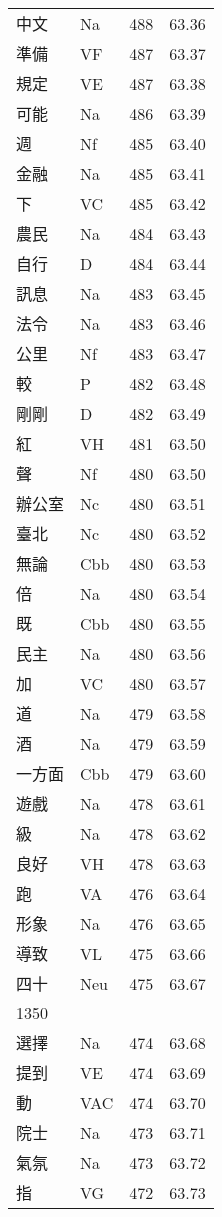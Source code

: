 \documentclass[twocolumn]{book}
\begin{document}
\begin{supertabular}{llrr}
中文 & Na & 488 &  63.36\\
準備 & VF & 487 &  63.37\\
規定 & VE & 487 &  63.38\\
可能 & Na & 486 &  63.39\\
週 & Nf & 485 &  63.40\\
金融 & Na & 485 &  63.41\\
下 & VC & 485 &  63.42\\
農民 & Na & 484 &  63.43\\
自行 & D & 484 &  63.44\\
訊息 & Na & 483 &  63.45\\
法令 & Na & 483 &  63.46\\
公里 & Nf & 483 &  63.47\\
較 & P & 482 &  63.48\\
剛剛 & D & 482 &  63.49\\
紅 & VH & 481 &  63.50\\
聲 & Nf & 480 &  63.50\\
辦公室 & Nc & 480 &  63.51\\
臺北 & Nc & 480 &  63.52\\
無論 & Cbb & 480 &  63.53\\
倍 & Na & 480 &  63.54\\
既 & Cbb & 480 &  63.55\\
民主 & Na & 480 &  63.56\\
加 & VC & 480 &  63.57\\
道 & Na & 479 &  63.58\\
酒 & Na & 479 &  63.59\\
一方面 & Cbb & 479 &  63.60\\
遊戲 & Na & 478 &  63.61\\
級 & Na & 478 &  63.62\\
良好 & VH & 478 &  63.63\\
跑 & VA & 476 &  63.64\\
形象 & Na & 476 &  63.65\\
導致 & VL & 475 &  63.66\\
四十 & Neu & 475 &  63.67\\
1350\\
選擇 & Na & 474 &  63.68\\
提到 & VE & 474 &  63.69\\
動 & VAC & 474 &  63.70\\
院士 & Na & 473 &  63.71\\
氣氛 & Na & 473 &  63.72\\
指 & VG & 472 &  63.73\\

\end{supertabular}
\end{document}
